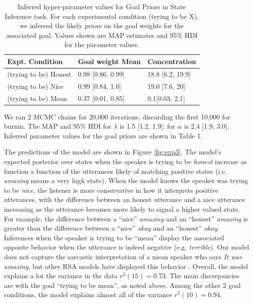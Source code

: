 \documentclass[10pt,letterpaper]{article}
\newcommand{\red}[1]{\textcolor{Red}{#1}}
\newcommand{\mht}[1]{\textcolor{DarkOrange}{[mht: #1]}}
\begin{document}
\begin{table}[]
\label{my-table}
\begin{tabular}{lll}
\hline
Expt. Condition  & Goal weight Mean & Concentration \\ \hline
(trying to be) Honest                        &   0.98 [0.86, 0.99]   & 18.8 [6.2, 19.9] \\
(trying to be) Nice                          & 0.99 [0.84, 1.0] & 19.0 [7.6, 20] \\
(trying to be) Mean                          &0.37 [0.01, 0.85] & 0.1[0.03, 2.1] \\ \hline
\end{tabular}
\caption{Inferred hyper-parameter values for Goal Priors in State Inference task.
For each experimental condition (trying to be X), we inferred the likely priors on the goal weights for the associated goal.
Values shown are MAP estimates and 95\% HDI for the parameter values.}
\end{table}
We ran 2 MCMC chains for 20,000 iterations, discarding the first 10,000 for burnin.
The MAP and 95\% HDI for $\lambda$ is 1.5 [1.2, 1.9]; for $\alpha$ is 2.4 [1.9, 3.0]. %
Inferred parameter values for the goal priors are shown in Table 1.

The predictions of the model are shown in Figure \ref{fig:exp3}.
The model's expected posterior over states when the speaker is trying to be \emph{honest} increase as function a function of the utterances likely of matching positive states (i.e. \emph{amazing} means a very high state).
When the model knows the speaker was trying to be \emph{nice}, the listener is more conservative in how it interprets positive utterances, with the difference between an honest utterance and a nice utterance increasing as the utterance becomes more likely to signal a higher valued state. 
For example, the difference between a ``nice'' \emph{amazing} and an ``honest'' \emph{amazing} is greater than the difference between a ``nice'' \emph{okay} and an ``honest'' \emph{okay}.
Inferences when the speaker is trying to be ``mean'' display the associated opposite behavior when the utterance is indeed negative (e.g. \emph{terrible}).
Our model does not capture the sarcastic interpretation of a mean speaker who says \emph{It was amazing}, but other RSA models have displayed this behavior \cite{Kao2015}.%
Overall, the model explains a lot the variance in the data $r^2(15) = 0.73$. 
The main discrepancies are with the goal ``trying to be mean'', as noted above. 
Among the other 2 goal conditions, the model explains almost all of the variance $r^2(10) = 0.94$. 
\end{document}

